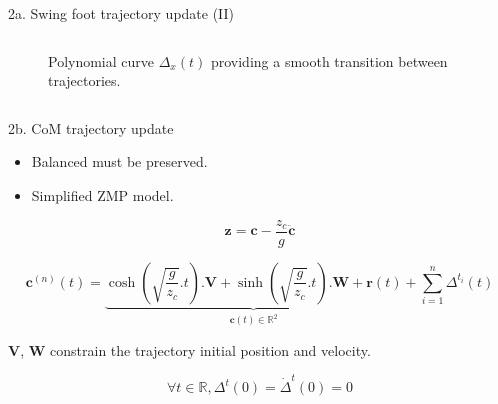 \documentclass[hyperref={pdfpagelabels=false}]{beamer}
\begin{document}
\begin{frame}{2a. Swing foot trajectory update (II)}
\begin{columns}[c]
\begin{column}{0.5\textwidth}
\begin{figure}[ht!]
\begin{center}
  \end{center}
  \caption{Polynomial curve $\Delta_{x}(t)$ providing a smooth
    transition between trajectories. \label{fig:transition}}
\end{figure}

    \end{column}
   \end{columns}

\end{frame}

\begin{frame}{2b. CoM trajectory update}

  \begin{itemize}
  \item Balanced must be preserved.
  \item Simplified ZMP model.\\
    \footnotesize
    \cite{11icra.perrin}
  \end{itemize}

  \begin{equation}
    \mathbf{z} = \mathbf{c} - \frac{z_c}{g} \ddot{\mathbf{c}}
  \end{equation}

  \begin{equation} \label{eq:zmpsolcor}
    \mathbf{c}^{(n)}(t) =
    \underbrace{\scriptstyle \cosh(\sqrt{\frac{g}{z_c}}.t) . \mathbf{V} +
      \sinh(\sqrt{\frac{g}{z_c}}.t) . \mathbf{W} +
      \mathbf{r}(t)}_{\mathbf{c}(t) \in \mathbb{R}^2} + \sum_{i=1}^n \Delta^{t_i}(t)
  \end{equation}

  \begin{center}
    $\mathbf{V}$, $\mathbf{W}$ constrain the trajectory initial
    position and velocity.
  \end{center}

  \begin{equation}
    \forall t \in \mathbb{R}, \Delta^t(0) = \dot{\Delta}^t(0) = 0
  \end{equation}
\end{frame}
\end{document}
